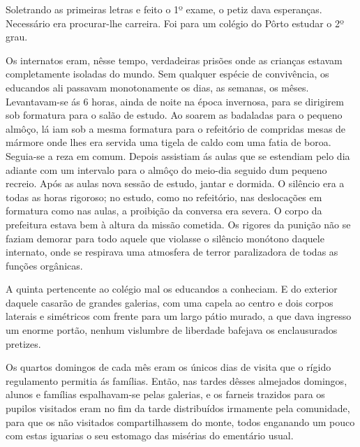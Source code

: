 \documentclass[9pt]{article}
\begin{document}
Soletrando as primeiras letras e feito o 1º exame, o petiz dava esperan\-ças. Necessário era procurar-\-lhe carreira. Foi para um colégio do
Pôrto estudar o 2º grau.

Os internatos eram, nêsse tempo, verdadeiras prisões onde as crian\-ças
estavam completamente isoladas do mundo. Sem qualquer espécie de convivência, os educandos ali passavam monotonamente os dias, as semanas, os
mêses. Levantavam-se ás 6 horas, ainda de noite na época invernosa, para
se dirigirem sob formatura para o salão de estudo. Ao soarem as badaladas
para o pequeno almôço, lá iam sob a mesma formatura para o refeitório de
compridas mesas de mármore onde lhes era servida uma tigela de caldo
com uma fatia de boroa. Seguia-se a reza em comum. Depois assistiam ás
aulas que se estendiam pelo dia adiante com um intervalo para o almôço
do meio-dia seguido dum pequeno recreio. Após as aulas nova sessão de
estudo, jantar e dormida. O silêncio era a todas as horas rigoroso; no
estudo, como no refeitório, nas desloca\-ções em formatura como nas aulas,
a proibi\-ção da conversa era severa. O corpo da prefeitura estava bem à
altura da missão cometida. Os rigores da puni\-ção não se faziam demorar
para todo aquele que violasse o silêncio monótono daquele internato, onde se respirava uma atmosfera de terror paralizadora de todas as fun\-ções
orgânicas.

A quinta pertencente ao colégio mal os educandos a conheciam. E do
exterior daquele casarão de gran\-des galerias, com uma capela ao centro
e dois corpos laterais e simétricos com frente para um largo pátio murado, a que dava ingresso um enorme portão, nenhum vislumbre de liberdade
bafejava os enclausurados pretizes.

Os quartos domingos de cada mês eram os únicos dias de visita que
o rígido regulamento permitia ás fa\-mí\-lias. Então, nas tardes dêsses almejados domingos, alunos e fa\-mí\-lias espa\-lhavam-se pelas galerias, e os farneis trazidos para os pupilos visitados eram no fim da tarde distribuídos irmamente pela comunidade, para que os não visitados comparti\-lhassem do monte, todos enganando um pouco com estas iguarias o seu estomago
das misérias do ementário usual.
\end{document}
